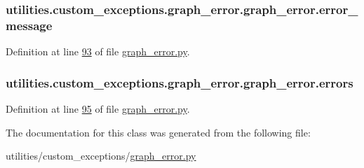 \subsubsection[{error\+\_\+message}]{\setlength{\rightskip}{0pt plus 5cm}utilities.\+custom\+\_\+exceptions.\+graph\+\_\+error.\+graph\+\_\+error.\+error\+\_\+message}\label{classutilities_1_1custom__exceptions_1_1graph__error_1_1graph__error_a98eabd7ef4fec2794e8b88e3af478de6}


Definition at line \hyperlink{graph__error_8py_source_l00093}{93} of file \hyperlink{graph__error_8py_source}{graph\+\_\+error.\+py}.

\hypertarget{classutilities_1_1custom__exceptions_1_1graph__error_1_1graph__error_abc34ad82ec3f8374e1ff60c5c888a3eb}{}
\subsubsection[{errors}]{\setlength{\rightskip}{0pt plus 5cm}utilities.\+custom\+\_\+exceptions.\+graph\+\_\+error.\+graph\+\_\+error.\+errors}\label{classutilities_1_1custom__exceptions_1_1graph__error_1_1graph__error_abc34ad82ec3f8374e1ff60c5c888a3eb}


Definition at line \hyperlink{graph__error_8py_source_l00095}{95} of file \hyperlink{graph__error_8py_source}{graph\+\_\+error.\+py}.



The documentation for this class was generated from the following file\+:\begin{DoxyCompactItemize}
\item 
utilities/custom\+\_\+exceptions/\hyperlink{graph__error_8py}{graph\+\_\+error.\+py}\end{DoxyCompactItemize}
